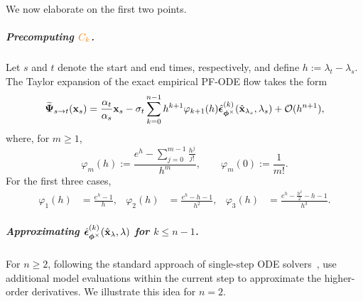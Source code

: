 We now elaborate on the first two points.


\subparagraph{Precomputing ${\color{orange}C_k}$.}
Let $s$ and $t$ denote the start and end times, respectively, and define
$h:=\lambda_t-\lambda_s$. The Taylor expansion of the exact empirical
PF-ODE flow takes the form
\begin{equation}
\label{eq:analytic_expansion}
\widetilde{{\bm{\Psi}}}_{s\to t}({\mathbf{x}}_s)
=
\frac{\alpha_t}{\alpha_s}{\mathbf{x}}_s
-
\sigma_t
\sum_{k=0}^{n-1}
h^{k+1}
\varphi_{k+1}(h)
\hat{\bm{\epsilon}}_{\bm{\phi}^\times}^{(k)}
(\hat{{\mathbf{x}}}_{\lambda_s},\lambda_s)
+
\mathcal O(h^{n+1}),
\end{equation}
where, for $m\geq1$,
\[
\varphi_m(h)
:=
\frac{
e^h-\sum_{j=0}^{m-1}\frac{h^j}{j!}
}{
h^m
},
\qquad
\varphi_m(0):=\frac{1}{m!}.
\]
For the first three cases,
\begin{align*}
\varphi_1(h)
&=
\frac{e^h-1}{h},
&
\varphi_2(h)
&=
\frac{e^h-h-1}{h^2},
&
\varphi_3(h)
&=
\frac{e^h-\frac{h^2}{2}-h-1}{h^3}.
\end{align*}




\subparagraph{Approximating {\color{cyan}$\hat{\bm{\epsilon}}_{\bm{\phi}^\times}^{(k)}(\hat{{\mathbf{x}}}_\lambda,\lambda)$} for $k \leq n-1$.}
For $n \geq 2$, following the standard approach of single-step ODE
solvers~\citep{atkinson2009numerical}, \citet{lu2022dpm} use additional model
evaluations within the current step to approximate the higher-order
derivatives. We illustrate this idea for $n=2$.

